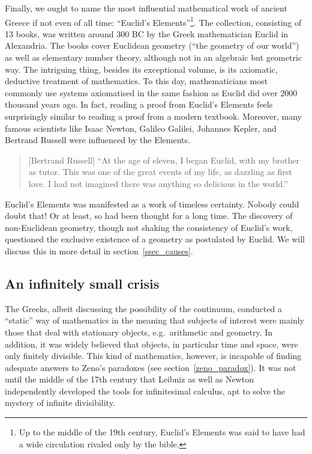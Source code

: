 \documentclass[hidelinks]{article}
\begin{document}
Finally, we ought to name the most influential mathematical work of ancient Greece if not even of all time: ``Euclid's Elements''\footnote{Up to the middle of the 19th century, Euclid's Elements was said to have had a wide circulation rivaled only by the bible.}. 
The collection, consisting of 13 books, was written around 300 BC by the Greek mathematician Euclid in Alexandria. The books cover Euclidean geometry (``the geometry of our world'') as well as elementary number theory, although not in an algebraic but geometric way. The intriguing thing, besides its exceptional volume, is its axiomatic, deductive treatment of mathematics. To this day, mathematicians most commonly use systems axiomatised in the same fashion as Euclid did over 2000 thousand years ago. In fact, reading a proof from Euclid's Elements feels surprisingly similar to reading a proof from a modern textbook. Moreover, many famous scientists like Isaac Newton, Galileo Galilei, Johannes Kepler, and Bertrand Russell were influenced by the Elements.
\begin{quote}[Bertrand Russell]
	``At the age of eleven, I began Euclid, with my brother as tutor. This was one of the great events of my life, as dazzling as first love. I had not imagined there was anything so delicious in the world.''\cite{russell_autobiography}
\end{quote}
Euclid's Elements was manifested as a work of timeless certainty. Nobody could doubt that! Or at least, so had been thought for a long time. The discovery of non-Euclidean geometry, though not shaking the consistency of Euclid's work, questioned the exclusive existence of a geometry as postulated by Euclid. We will discuss this in more detail in section~\ref{ssec_causes}.

\subsection{An infinitely small crisis}
The Greeks, albeit discussing the possibility of the continuum, conducted a ``static'' way of mathematics in the meaning that subjects of interest were mainly those that deal with stationary objects, e.g.\ arithmetic and geometry. In addition, it was widely believed that objects, in particular time and space, were only finitely divisible. This kind of mathematics, however, is incapable of finding adequate answers to Zeno's paradoxes (see section~\ref{zeno_paradox}).
It was not until the middle of the 17th century that Leibniz as well as Newton independently developed the tools for infinitesimal calculus, apt to solve the mystery of infinite divisibility.
\end{document}
